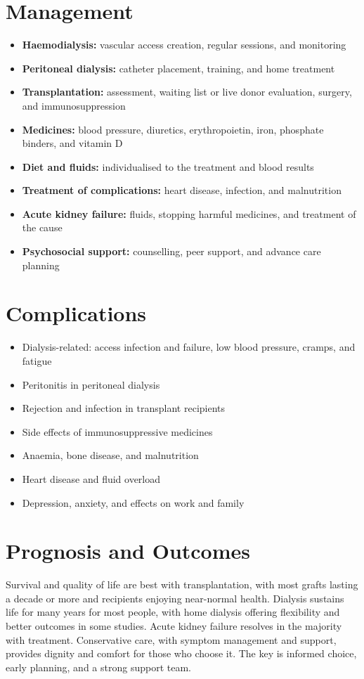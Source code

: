 \section*{Management}
\begin{itemize}
    \item \textbf{Haemodialysis:} vascular access creation, regular sessions, and monitoring
    \item \textbf{Peritoneal dialysis:} catheter placement, training, and home treatment
    \item \textbf{Transplantation:} assessment, waiting list or live donor evaluation, surgery, and immunosuppression
    \item \textbf{Medicines:} blood pressure, diuretics, erythropoietin, iron, phosphate binders, and vitamin D
    \item \textbf{Diet and fluids:} individualised to the treatment and blood results
    \item \textbf{Treatment of complications:} heart disease, infection, and malnutrition
    \item \textbf{Acute kidney failure:} fluids, stopping harmful medicines, and treatment of the cause
    \item \textbf{Psychosocial support:} counselling, peer support, and advance care planning
\end{itemize}

\section*{Complications}
\begin{itemize}
    \item Dialysis-related: access infection and failure, low blood pressure, cramps, and fatigue
    \item Peritonitis in peritoneal dialysis
    \item Rejection and infection in transplant recipients
    \item Side effects of immunosuppressive medicines
    \item Anaemia, bone disease, and malnutrition
    \item Heart disease and fluid overload
    \item Depression, anxiety, and effects on work and family
\end{itemize}

\section*{Prognosis and Outcomes}
Survival and quality of life are best with transplantation, with most grafts lasting a decade or more and recipients enjoying near-normal health. Dialysis sustains life for many years for most people, with home dialysis offering flexibility and better outcomes in some studies. Acute kidney failure resolves in the majority with treatment. Conservative care, with symptom management and support, provides dignity and comfort for those who choose it. The key is informed choice, early planning, and a strong support team.

